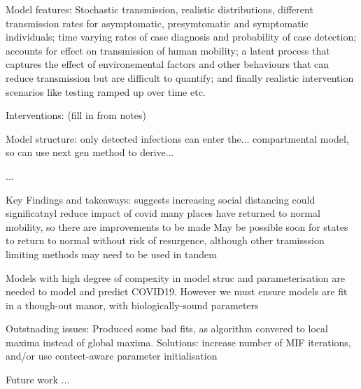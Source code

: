 Model features:
Stochastic transmission, realistic distributions, different transmission rates for asymptomatic, presymtomatic and symptomatic individuals; time varying rates of case diagnosis and probability of case detection; accounts for effect on transmission of human mobility; a latent process that captures the effect of environemental factors and other behaviours that can reduce transmission but are difficult to quantify; and finally realistic intervention scenarios like testing ramped up over time etc. 

Interventions: (fill in from notes)

Model structure: only detected infections can enter the...
compartmental model, so can use next gen method to derive...


...

Key Findings and takeaways:
suggests increasing social distancing could significatnyl reduce impact of covid
many places have returned to normal mobility, so there are improvements to be made
May be possible soon for states to return to normal without risk of resurgence, although other tramisssion limiting methods may need to be used in tandem

Models with high degree of compexity in model struc and parameterisation are needed to model and predict COVID19.
However we must ensure models are fit in a though-out manor, with biologically-sound parameters

Outstnading issues: 
Produced some bad fits, as algorithm convered to local maxima instead of global maxima.
Solutions: increase number of MIF iterations, and/or use contect-aware parameter initialisation

Future work
...
